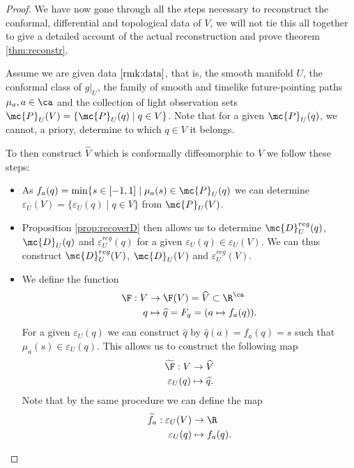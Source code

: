 \begin{proof}
We have now gone through all the steps necessary to reconstruct the conformal, differential and topological data of $V$, we will not tie this all together to give a detailed account of the actual reconstruction and prove theorem \ref{thm:reconstr}.

Assume we are given data $\ref{rmk:data}$, that is, the smooth manifold $U$, the conformal class of $g\rvert_U$, the family of smooth and timelike future-pointing paths $\mu_a, a\in \ca$ and the collection of light observation sets $\mc{P}_U(V)=\{\mc{P}_U(q)\mid q\in V\}$. Note that for a given  $\mc{P}_U(q)$, we cannot, a priory, determine to which $q\in V$ it belongs.

To then construct $\widehat{V}$ which is conformally diffeomorphic to $V$ we follow these steps:
\begin{itemize}
    \item As $f_a(q) = \min \{s\in [-1,1] \mid \mu_a(s) \in \mc{P}_U(q)$ we can determine $\varepsilon_U(V) = \{\varepsilon_U(q) \mid q\in V\}$ from $\mc{P}_U(V)$.
    \item Proposition \ref{prop:recoverD} then allows us to determine $\mc{D}^{reg}_U(q)$, $\mc{D}_U(q)$ and $\varepsilon_U^{reg}(q)$ for a given $\varepsilon_U(q)\in \varepsilon_U(V)$. We can thus construct $\mc{D}^{reg}_U(V)$, $\mc{D}_U(V)$ and $\varepsilon_U^{reg}(V)$.
    \item We define the function 
    \begin{align*}
        \F:V&\to \F(V) = \widehat{V} \subset \R^{\ca}\\
        q &\mapsto \widehat{q} = F_q = (a\mapsto f_a(q)).
    \end{align*}
    For a given $\varepsilon_U(q)$ we can construct $\widehat{q}$ by $\widehat{q}(a) = f_a(q) = s$ such that $\mu_a(s) \in \varepsilon_U(q)$.
    This allows us to construct the following map
    \begin{align*}
        \widetilde{\F}:V&\to \widehat{V}\\
        \varepsilon_U(q) &\mapsto \widehat{q}.
    \end{align*}
    Note that by the same procedure we can define the map
    \begin{align*}
        \widetilde{f}_a:\varepsilon_U(V)&\to\R\\
        \varepsilon_U(q) &\mapsto f_a(q).
    \end{align*}
    

\end{itemize}
\end{proof}
